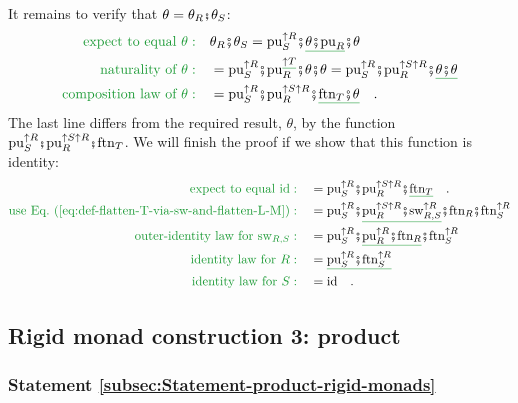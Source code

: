 It remains to verify that $\theta=\theta_{R}\bef\theta_{S}$:
\begin{align*}
{\color{greenunder}\text{expect to equal }\theta:}\quad & \theta_{R}\bef\theta_{S}=\text{pu}_{S}^{\uparrow R}\bef\gunderline{\theta\bef\text{pu}_{R}}\bef\theta\\
{\color{greenunder}\text{naturality of }\theta:}\quad & =\text{pu}_{S}^{\uparrow R}\bef\text{pu}_{R}^{\gunderline{\uparrow T}}\bef\theta\bef\theta=\text{pu}_{S}^{\uparrow R}\bef\text{pu}_{R}^{\uparrow S\uparrow R}\bef\gunderline{\theta\bef\theta}\\
{\color{greenunder}\text{composition law of }\theta:}\quad & =\text{pu}_{S}^{\uparrow R}\bef\text{pu}_{R}^{\uparrow S\uparrow R}\bef\gunderline{\text{ftn}_{T}\bef\theta}\quad.
\end{align*}
The last line differs from the required result, $\theta$, by the
function $\text{pu}_{S}^{\uparrow R}\bef\text{pu}_{R}^{\uparrow S\uparrow R}\bef\text{ftn}_{T}$.
We will finish the proof if we show that this function is identity:
\begin{align*}
{\color{greenunder}\text{expect to equal }\text{id}:}\quad & =\text{pu}_{S}^{\uparrow R}\bef\text{pu}_{R}^{\uparrow S\uparrow R}\bef\gunderline{\text{ftn}_{T}}\quad.\\
{\color{greenunder}\text{use Eq.~(\ref{eq:def-flatten-T-via-sw-and-flatten-L-M})}:}\quad & =\text{pu}_{S}^{\uparrow R}\bef\gunderline{\text{pu}_{R}^{\uparrow S\uparrow R}\bef\text{sw}_{R,S}^{\uparrow R}}\bef\text{ftn}_{R}\bef\text{ftn}_{S}^{\uparrow R}\\
{\color{greenunder}\text{outer-identity law for }\text{sw}_{R,S}:}\quad & =\text{pu}_{S}^{\uparrow R}\bef\gunderline{\text{pu}_{R}^{\uparrow R}\bef\text{ftn}_{R}}\bef\text{ftn}_{S}^{\uparrow R}\\
{\color{greenunder}\text{identity law for }R:}\quad & =\gunderline{\text{pu}_{S}^{\uparrow R}\bef\text{ftn}_{S}^{\uparrow R}}\\
{\color{greenunder}\text{identity law for }S:}\quad & =\text{id}\quad.
\end{align*}


\subsection{Rigid monad construction 3: product}

\subsubsection{Statement \label{subsec:Statement-product-rigid-monads}\ref{subsec:Statement-product-rigid-monads}}

